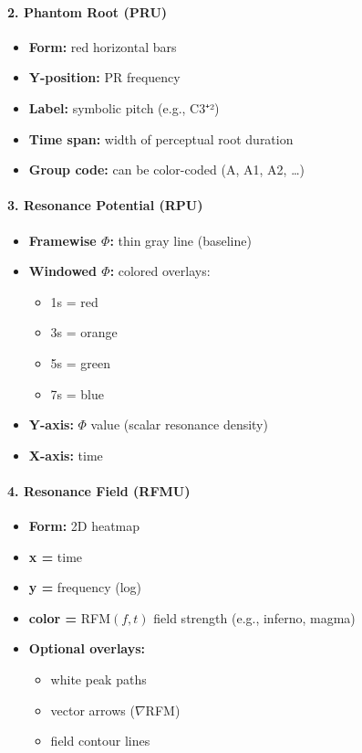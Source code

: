\paragraph{2. Phantom Root (PRU)}

\begin{itemize}
    \item \textbf{Form:} red horizontal bars
    \item \textbf{Y-position:} PR frequency
    \item \textbf{Label:} symbolic pitch (e.g., C3⁺²)
    \item \textbf{Time span:} width of perceptual root duration
    \item \textbf{Group code:} can be color-coded (A, A1, A2, …)
\end{itemize}

\paragraph{3. Resonance Potential (RPU)}

\begin{itemize}
    \item \textbf{Framewise $\Phi$:} thin gray line (baseline)
    \item \textbf{Windowed $\Phi$:} colored overlays:
    \begin{itemize}
        \item 1s = red
        \item 3s = orange
        \item 5s = green
        \item 7s = blue
    \end{itemize}
    \item \textbf{Y-axis:} $\Phi$ value (scalar resonance density)
    \item \textbf{X-axis:} time
\end{itemize}

\paragraph{4. Resonance Field (RFMU)}

\begin{itemize}
    \item \textbf{Form:} 2D heatmap
    \item \textbf{x =} time
    \item \textbf{y =} frequency (log)
    \item \textbf{color =} RFM$(f, t)$ field strength (e.g., inferno, magma)
    \item \textbf{Optional overlays:}
    \begin{itemize}
        \item white peak paths
        \item vector arrows ($\nabla$RFM)
        \item field contour lines
    \end{itemize}
\end{itemize}

